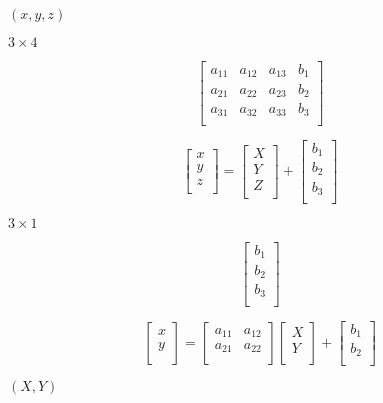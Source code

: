\documentclass{article}
\begin{document}
$(x,y,z)$
\pagebreak

$3 \times 4$
\pagebreak

\[ \begin{bmatrix} a_{11} & a_{12} & a_{13} & b_1\\ a_{21} & a_{22} & a_{23} & b_2\\ a_{31} & a_{32} & a_{33} & b_3\\ \end{bmatrix} \]
\pagebreak

\[ \begin{bmatrix} x\\ y\\ z\\ \end{bmatrix} = \begin{bmatrix} X\\ Y\\ Z\\ \end{bmatrix} + \begin{bmatrix} b_1\\ b_2\\ b_3\\ \end{bmatrix} \]
\pagebreak

$3 \times 1$
\pagebreak

\[ \begin{bmatrix} b_1 \\ b_2 \\ b_3 \\ \end{bmatrix} \]
\pagebreak

\[ \begin{bmatrix} x\\ y\\ \end{bmatrix} = \begin{bmatrix} a_{11} & a_{12}\\ a_{21} & a_{22}\\ \end{bmatrix} \begin{bmatrix} X\\ Y\\ \end{bmatrix} + \begin{bmatrix} b_1\\ b_2\\ \end{bmatrix} \]
\pagebreak

$(X,Y)$
\pagebreak
\end{document}
